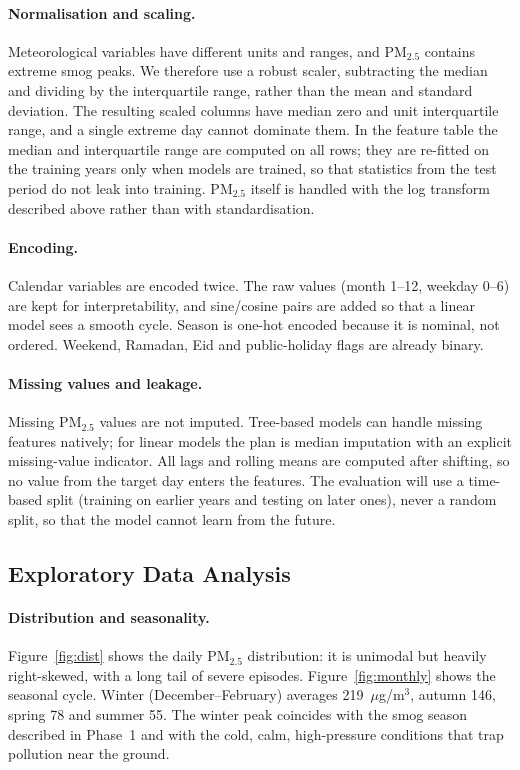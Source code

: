 \paragraph{Normalisation and scaling.}
Meteorological variables have different units and ranges, and PM$_{2.5}$ contains extreme smog peaks. We therefore use a robust scaler, subtracting the median and dividing by the interquartile range, rather than the mean and standard deviation. The resulting scaled columns have median zero and unit interquartile range, and a single extreme day cannot dominate them. In the feature table the median and interquartile range are computed on all rows; they are re-fitted on the training years only when models are trained, so that statistics from the test period do not leak into training. PM$_{2.5}$ itself is handled with the log transform described above rather than with standardisation.

\paragraph{Encoding.}
Calendar variables are encoded twice. The raw values (month 1--12, weekday 0--6) are kept for interpretability, and sine/cosine pairs are added so that a linear model sees a smooth cycle. Season is one-hot encoded because it is nominal, not ordered. Weekend, Ramadan, Eid and public-holiday flags are already binary.

\paragraph{Missing values and leakage.}
Missing PM$_{2.5}$ values are not imputed. Tree-based models can handle missing features natively; for linear models the plan is median imputation with an explicit missing-value indicator. All lags and rolling means are computed after shifting, so no value from the target day enters the features. The evaluation will use a time-based split (training on earlier years and testing on later ones), never a random split, so that the model cannot learn from the future.

\subsection{Exploratory Data Analysis}

\paragraph{Distribution and seasonality.}
Figure~\ref{fig:dist} shows the daily PM$_{2.5}$ distribution: it is unimodal but heavily right-skewed, with a long tail of severe episodes. Figure~\ref{fig:monthly} shows the seasonal cycle. Winter (December--February) averages 219~$\mu$g/m$^3$, autumn 146, spring 78 and summer 55. The winter peak coincides with the smog season described in Phase~1 and with the cold, calm, high-pressure conditions that trap pollution near the ground.

